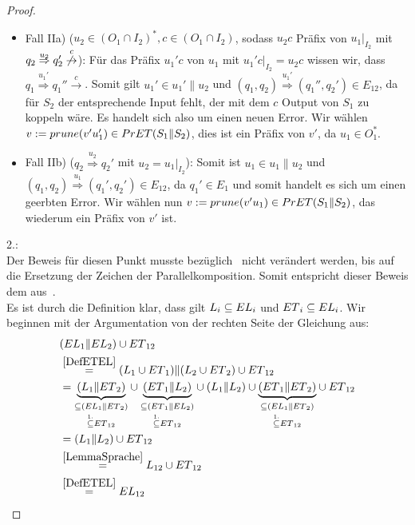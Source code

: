 \begin{proof}
\begin{itemize}
\begin{itemize}
      \item Fall IIa) ($u_2\in (O_1\cap I_2)^*, c\in (O_1\cap I_2)$, sodass
        $u_2c$ Präfix von $u_1|_{I_2}$ mit $q_2 \overset{u_2}{\Rightarrow} q_2'
        \overset{c}{\not{\hspace{-0.1cm}\rightarrow}}$): Für das Präfix $u_1'c$
        von $u_1$ mit $u_1'c|_{I_2}=u_2c$ wissen wir, dass $q_1
        \overset{u_1'}{\Rightarrow} q_1'' \overset{c}{\rightarrow}$. Somit gilt
        $u_1'\in u_1'\|u_2$ und $(q_1,q_2) \overset{u_1'}{\Rightarrow}
        (q_1'',q_2')\in E_{12}$, da für $S_2$ der entsprechende Input fehlt,
        der mit dem $c$ Output von $S_1$ zu koppeln wäre. Es handelt sich also
        um einen neuen Error. Wir wählen $v:=prune{}(v'u_1')\in PrET{}(S_1\| S_2)$,
        dies ist ein Präfix von $v'$, da $u_1\in O_1^*$.
      \item Fall IIb) ($q_2 \overset{u_2}{\Rightarrow} q_2'$ mit
        $u_2=u_1|_{I_2}$): Somit ist $u_1\in u_1\|u_2$ und $(q_1,q_2)
        \overset{u_1}{\Rightarrow} (q_1',q_2')\in E_{12}$, da $q_1'\in E_1$ und
        somit handelt es sich um einen geerbten Error. Wir wählen nun $v:=prune{}
        (v'u_1)\in PrET{}(S_1\|S_2)$, das wiederum ein Präfix von $v'$ ist.
    \end{itemize}
  \end{itemize}

  2.:\\
  Der Beweis für diesen Punkt musste bezüglich~\cite{Vogler2014EIO} nicht
  verändert werden, bis auf die Ersetzung der Zeichen der Parallelkomposition.
  Somit entspricht dieser Beweis dem aus~\cite{Vogler2014EIO}.\\
  Es ist durch die Definition klar, dass gilt $L_i\subseteq EL{}_i$ und
  $ET{}_i\subseteq EL{}_i$. Wir beginnen mit der Argumentation von der rechten
  Seite der Gleichung aus:
  \begin{align*}
    &(EL{}_1\| EL{}_2)\cup ET{}_{12}\\
    &\overset{\ref{DefETEL}}{=}(L_1\cup ET{}_1)\|(L_2\cup ET{}_2)\cup ET{}_{12}\\
    &=\underset{\overset{1.}{\subseteq} ET{}_{12}}{\underset{\subseteq
    (EL{}_1\|ET{}_2)}{\underbrace{(L_1\|ET{}_2)}}} \cup
    \underset{\overset{1.}{\subseteq} ET{}_{12}}{\underset{\subseteq
    (ET{}_1\|EL{}_2)}{\underbrace{(ET{}_1\|L_2)}}} \cup
    (L_1\|L_2) \cup \underset{\overset{1.}{\subseteq}
    ET{}_{12}}{\underset{\subseteq (EL{}_1\|ET{}_2)}{\underbrace{(ET{}_1\|ET{}_2)}}} \cup
    ET{}_{12}\\
    &=(L_1\|L_2) \cup ET{}_{12}\\
    &\overset{\ref{LemmaSprache}}{=}L_{12}\cup ET{}_{12}\\
    &\overset{\ref{DefETEL}}{=}EL{}_{12}
  \end{align*}
\end{proof}

